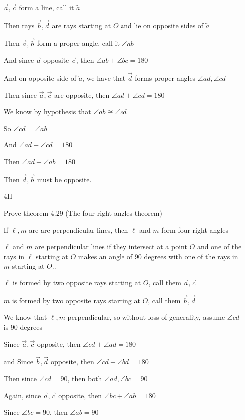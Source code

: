 \documentclass[11pt]{article}
\newcommand{\ray}[1]{\overrightarrow{#1}}
\newcommand{\lines}[1]{\overleftrightarrow{#1}}
\begin{document}
\begin{itemize}
		$\ray{a}, \ray{c}$ form a line, call it $\lines{a}$

		Then rays $\ray{b}, \ray{d}$ are rays starting at $O$ and lie on opposite sides of $\lines{a}$

		Then $\ray{a}, \ray{b}$ form a proper angle, call it $\angle{ab}$

		And since $\ray{a}$ opposite $\ray{c}$, then $\angle{ab} + \angle{bc} = 180$

		And on opposite side of $\lines{a}$, we have that $\ray{d}$ forms proper angles $\angle{ad}, \angle{cd}$

		Then since $\ray{a},\ray{c}$ are opposite, then $\angle{ad} + \angle{cd} = 180$

		We know by hypothesis that $\angle{ab} \cong \angle{cd}$

		So $\angle{cd} = \angle{ab}$

		And $\angle{ad} + \angle{cd} = 180$

		Then $\angle{ad} + \angle{ab} = 180$

		Then $\ray{d}, \ray{b}$ must be opposite.

	\item[4H]

		Prove theorem 4.29 (The four right angles theorem)

		If $\ell, m$ are are perpendicular lines, then $\ell$ and $m$ form four right angles

		$\ell$ and $m$ are perpendicular lines if they intersect at a point $O$ and one of the rays in $\ell$ starting at $O$ makes an angle of 90 degrees with one of the rays in $m$ starting at $O$..

		$\ell$ is formed by two opposite rays starting at $O$, call them $\ray{a}, \ray{c}$

		$m$ is formed by two opposite rays starting at $O$, call them $\ray{b}, \ray{d}$

		We know that $\ell, m$ perpendicular, so without loss of generality, assume $\angle{cd}$ is 90 degrees

		Since $\ray{a},\ray{c}$ opposite, then $\angle{cd} + \angle{ad} = 180$

		and Since $\ray{b},\ray{d}$ opposite, then $\angle{cd} + \angle{bd} = 180$

		Then since $\angle{cd} = 90$, then both $\angle{ad}, \angle{bc} = 90$

		Again, since $\ray{a}, \ray{c}$ opposite, then $\angle{bc} + \angle{ab} = 180$

		Since $\angle{bc} = 90$, then $\angle{ab} = 90$


\end{itemize}
\end{document}
